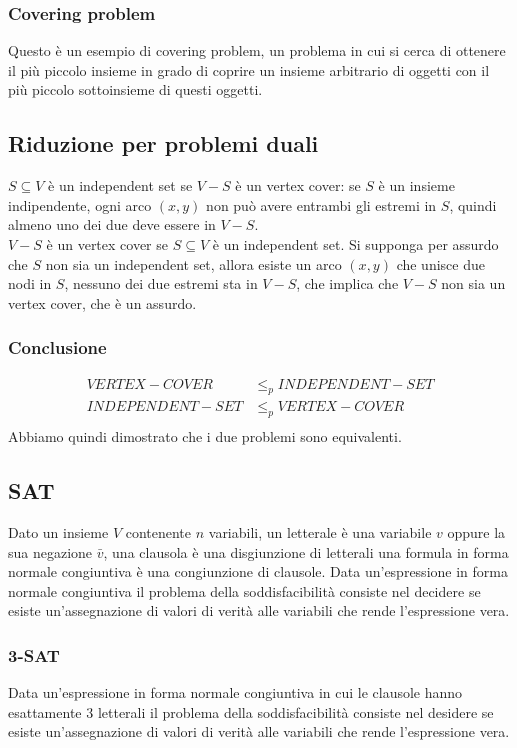 \subsubsection{Covering problem}
Questo \`e un esempio di covering problem, un problema in cui si cerca di ottenere il pi\`u piccolo insieme in grado di coprire un insieme arbitrario di oggetti con il pi\`u piccolo 
sottoinsieme di questi oggetti.
\subsection{Riduzione per problemi duali}
$S\subseteq V$ \`e un independent set se $V-S$ \`e un vertex cover: se $S$ \`e un insieme indipendente, ogni arco $(x, y)$ non pu\`o avere entrambi gli estremi in $S$, quindi almeno uno
dei due deve essere in $V-S$.\\
$V-S$ \`e un vertex cover se $S\subseteq V$ \`e un independent set. Si supponga per assurdo che $S$ non sia un independent set, allora esiste un arco $(x, y)$ che unisce due nodi in $S$,
nessuno dei due estremi sta in $V-S$, che implica che $V-S$ non sia un vertex cover, che \`e un assurdo.
\subsubsection{Conclusione}
\begin{align*}
	VERTEX-COVER &\le_p INDEPENDENT-SET\\
	INDEPENDENT-SET &\le_p VERTEX-COVER\\
\end{align*}
Abbiamo quindi dimostrato che i due problemi sono equivalenti.
\subsection{SAT}
Dato un insieme $V$ contenente $n$ variabili, un letterale \`e una variabile $v$ oppure la sua negazione $\bar{v}$, una clausola \`e una disgiunzione di letterali una formula in forma
normale congiuntiva \`e una congiunzione di clausole. Data un'espressione in forma normale congiuntiva il problema della soddisfacibilit\`a consiste nel decidere se esiste 
un'assegnazione di valori di verit\`a alle variabili che rende l'espressione vera.
\subsubsection{3-SAT}
Data un'espressione in forma normale congiuntiva in cui le clausole hanno esattamente $3$ letterali il problema della soddisfacibilit\`a consiste nel desidere se esiste un'assegnazione
di valori di verit\`a alle variabili che rende l'espressione vera.
